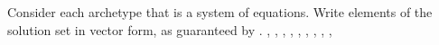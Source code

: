 Consider each archetype that is a system of equations. Write elements of the solution set in vector form, as guaranteed by .\newline\newline
{},
,
,
,
,
,
,
,
,


